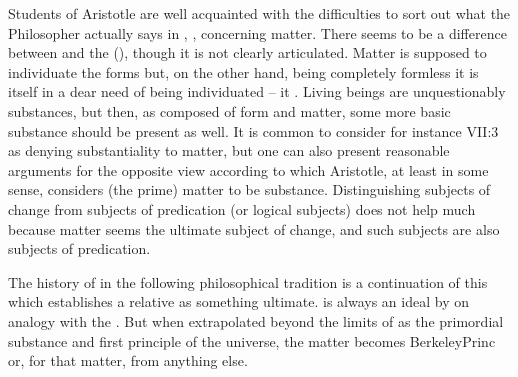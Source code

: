 \pa\label{pa:matterAristotle} Students of Aristotle are well acquainted with the
difficulties to sort out what the Philosopher actually says in
, ,  concerning matter. There
seems to be a difference between  and the 
(), though it is not clearly articulated. Matter is supposed to individuate the forms but, on the other
hand, being completely formless it is itself in a dear need of being
individuated -- it . Living beings are unquestionably
substances, but then, as composed of form and matter, some more basic substance
should be present as well. It is common to consider for instance
 VII:3 as denying substantiality to matter, but one
can also present reasonable arguments for the opposite view according to which
Aristotle, at least in some sense, considers (the prime) matter to be
substance.  Distinguishing subjects of
change from subjects of predication (or logical subjects) does not help much
because matter seems the ultimate subject of change, and such subjects are also
subjects of predication.


\pa The history of  in the following philosophical tradition 
is a continuation of this  which establishes
a relative  as something ultimate.  is
always an ideal  by  on analogy
with the .
But when extrapolated beyond the limits of  as the primordial
  substance and first principle of the universe, the matter becomes
    \citet{an incomprehensible somewhat,
  which hath none of those particular qualities whereby the bodies falling under
  our senses are distinguished from one another}{BerkeleyPrinc}{} or,
for that matter, from anything else.

